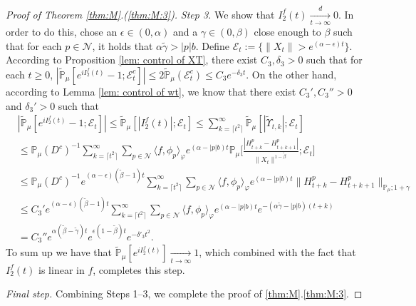 \documentclass[12pt,a4paper]{amsart}
\theoremstyle{plain}
\theoremstyle{definition}
\numberwithin{equation}{section}
\begin{document}
\begin{proof}[Proof of Theorem \ref{thm:M}.(\ref{thm:M:3})]
\emph{Step 3.} We show that $I^f_2(t) \xrightarrow[t\to \infty]{d} 0$. 
In order to do this, chose an $\epsilon \in (0,\alpha)$ and a $\gamma \in (0,\beta)$ close enough to $\beta$ such that for each $p\in \mathcal N$, it holds that $\alpha \tilde \gamma > |p|b$. 
Define $\mathcal E_t:= \{\|X_t\| > e^{(\alpha - \epsilon)t}\}$.
According to Proposition \ref{lem: control of XT}, there exist $C_3, \delta_3 > 0$ such that for each $t\geq 0$, $|\widetilde {\mathbb {P}}_\mu[e^{i I_2^f(t)} - 1; \mathcal E_t^c]|\leq 2\widetilde {\mathbb {P}}_\mu(\mathcal E_t^c) \leq C_3 e^{- \delta_3 t}$. 
On the other hand, according to Lemma \ref{lem: control of wt}, we know that there exist $C_3',C_3''>0$ and $\delta_3'>0$ such that
\begin{align}
	& |\widetilde {\mathbb {P}}_\mu[e^{i I_{2}^{f}(t)} - 1; \mathcal {E}_t]|
   \leq  \widetilde {\mathbb {P}}_\mu[ | I_{2}^{f}(t)|; \mathcal {E}_t]
   \leq \sum_{k = \lceil t^2\rceil}^\infty \widetilde {\mathbb {P}}_\mu[ |\widetilde {\Upsilon}_{t,k}|; \mathcal {E}_t]
  \\ & \leq \mathbb P_\mu(D^c)^{-1} \sum_{k = \lceil t^2\rceil}^\infty \sum_{p \in \mathcal N} \langle f,\phi_p\rangle_\varphi e^{(\alpha - |p|b)t}\mathbb {P}_\mu\Big[\frac{ |H_{t+k}^p - H_{t+k+1}^p|}{\|X_t\|^{1- \tilde \beta}}; \mathcal E_t\Big]
  \\ & \leq \mathbb P_\mu(D^c)^{-1} e^{(\alpha - \epsilon) (\tilde \beta - 1) t} \sum_{k = \lceil t^2\rceil}^\infty \sum_{p \in \mathcal N} \langle f,\phi_p\rangle_\varphi e^{(\alpha - |p|b)t}\|H_{t+k}^p - H_{t+k+1}^p\|_{\mathbb P_\mu; 1+\gamma}
  \\ & \leq C_3' e^{(\alpha - \epsilon) (\tilde \beta - 1) t} \sum_{k = \lceil t^2\rceil}^\infty \sum_{p \in \mathcal N} \langle f,\phi_p\rangle_\varphi e^{(\alpha - |p|b)t} e^{- (\alpha \tilde \gamma - |p|b)(t+k)}
  \\ & = C_3'' e^{ \alpha (\tilde \beta - \tilde \gamma) t } e^{ \epsilon (1 - \tilde \beta) t}e^{- \delta'_3 t^2}.
\end{align}
To sum up we have that $\widetilde {\mathbb P}_\mu[e^{iI_2^f(t)}] \xrightarrow[t\to \infty]{} 1$, which combined with the fact that $I_2^f(t)$ is linear in $f$, completes this step.


\emph{Final step.} Combining Steps 1--3, we complete the proof of \ref{thm:M}.\eqref{thm:M:3}.
\end{proof}

\appendix
\section{ }
\end{document}
